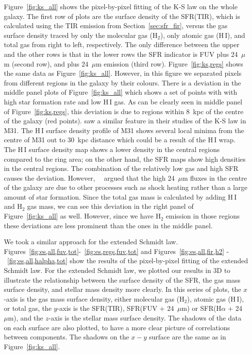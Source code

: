 Figure~\ref{fig:ks_all} shows the pixel-by-pixel fitting of the K-S law on the whole galaxy. The first row of plots are the surface density of the SFR(TIR), which is calculated using the TIR emission from Section~\ref{sec:sfr_fir}, versus the gas surface density traced by only the molecular gas (H$_2$), only atomic gas (H\,{\sc I}), and total gas from right to left, respectively. 
The only difference between the upper and the other rows is that in the lower rows the SFR indicator is FUV plus 24~$\mu$m (second row), and \halpha plus 24~$\mu$m emission (third row). Figure~\ref{fig:ks,regs} shows the same data as Figure~\ref{fig:ks_all}. However, in this figure we separated pixels from different regions in the galaxy by their colours. 
 There is a deviation in the middle panel plots of Figure~\ref{fig:ks_all} which shows a set of points with with high star formation rate and low H\,{\sc I} gas.
As can be clearly seen in middle panel of Figure~\ref{fig:ks,regs}, this deviation is due to regions within 8~kpc of the centre of the galaxy (red points).
 \cite{Braun09} saw a similar feature in their studies of the K-S law in M31. 
The H\,{\sc I} surface density profile of M31 \citep[see figure 16 in][]{Chemin09} shows several local minima from the centre of M31 out to 30~kpc distance which could be a result of the H\,{\sc I} wrap. The H\,{\sc I} surface density map shows a lower density in the central regions compared to the ring area; on the other hand, the SFR maps show high densities in the central regions. The combination of the relatively low gas and high SFR causes the deviation. However,~~\cite{Braun09} argued that the high 24~$\mu$m fluxes in the centre of the galaxy are due to other processes such as shock heating rather than a large amount of star formation.
Since the total gas mass is calculated by adding H\,{\sc I} and H$_2$ gas mass, we can see this deviation in the right panel of Figure~\ref{fig:ks_all} as well. However, since we have H$_2$ emission in those regions these deviations are less prominent than the ones in the middle panel.

We took a similar approach for the extended Schmidt law. Figures~\ref{fig:es,all,fuv,tot}-~\ref{fig:es,regs,fuv,tot} and Figures~\ref{fig:es,all,fir,h2} - ~\ref{fig:es,all,halpha,tot} show the results of the pixel-by-pixel fitting of the extended Schmidt law. For the extended Schmidt law, we plotted our results in 3D to illustrate the relationship between the surface density of the SFR, the gas mass surface density, and stellar mass density more clearly. In this series of plots, the $x$-axis is the gas mass surface density, either molecular gas (H$_2$), atomic gas (H\,{\sc I}), or total gas, the $y$-axis is the SFR(TIR), SFR(FUV + 24~$\mu$m) or SFR(H$\alpha$ + 24~$\mu$m), and the $z$-axis is the stellar mass surface density. The shadows of the data on each surface are also plotted, to have a more clear picture of correlations between components. The shadows on the $x-y$ surface are the same as in Figure~\ref{fig:ks_all}. 

